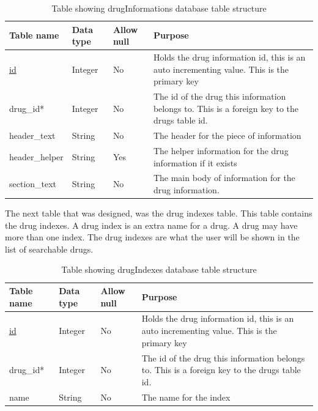 \begin{center}
\begin{longtable}{|l|l|l|p{8cm}|}
\caption{Table showing drugInformations database table structure}\tabularnewline
\hline
\textbf{Table name} & \textbf{Data type} & \textbf{Allow null} & \textbf{Purpose}                                                                             \\ \hline
\uline{id}                  & Integer            & No                  & Holds the drug information id, this is an auto incrementing value. This is the primary key   \\ \hline
drug\_id*           & Integer            & No                  & The id of the drug this information belongs to. This is a foreign key to the drugs table id. \\ \hline
header\_text        & String             & No                  & The header for the piece of information                                                      \\ \hline
header\_helper      & String             & Yes                 & The helper information for the drug information if it exists                                 \\ \hline
section\_text       & String             & No                  & The main body of information for the drug information.                                       \\ \hline
\end{longtable}
\end{center}
The next table that was designed, was the drug indexes table. This table contains the drug indexes. A drug index is an extra name for a drug. A drug may have more than one index. The drug indexes are what the user will be shown in the list of searchable drugs.

\begin{center}
\begin{longtable}{|l|l|l|p{8cm}|}
\caption{Table showing drugIndexes database table structure}\tabularnewline
\hline
\textbf{Table name} & \textbf{Data type} & \textbf{Allow null} & \textbf{Purpose}                                                                             \\ \hline
\uline{id}                  & Integer            & No                  & Holds the drug information id, this is an auto incrementing value. This is the primary key   \\ \hline
drug\_id*           & Integer            & No                  & The id of the drug this information belongs to. This is a foreign key to the drugs table id. \\ \hline
name                & String             & No                  & The name for the index                                                                       \\ \hline
\end{longtable}
\end{center}

